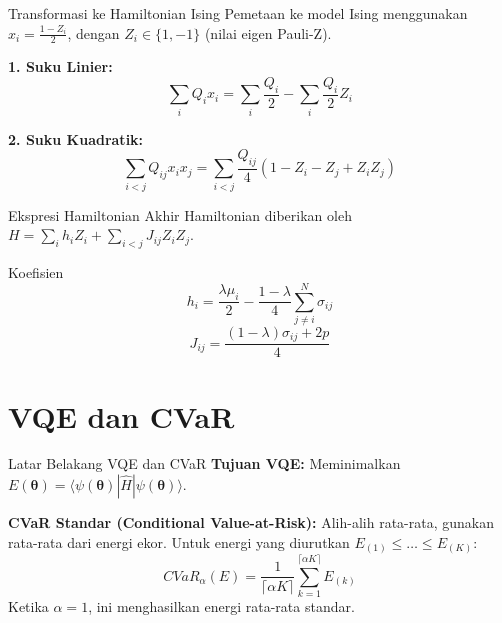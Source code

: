 \begin{frame}{Transformasi ke Hamiltonian Ising}
    Pemetaan ke model Ising menggunakan $x_i = \frac{1 - Z_i}{2}$, dengan $Z_i \in \{1, -1\}$ (nilai eigen Pauli-Z).
    \vspace{0.5cm}
    
    \textbf{1. Suku Linier:}
    $$ \sum_{i} Q_i x_i = \sum_{i} \frac{Q_i}{2} - \sum_{i} \frac{Q_i}{2} Z_i $$

    \textbf{2. Suku Kuadratik:}
    $$ \sum_{i<j} Q_{ij} x_i x_j = \sum_{i<j} \frac{Q_{ij}}{4} (1 - Z_i - Z_j + Z_i Z_j) $$
\end{frame}

\begin{frame}{Ekspresi Hamiltonian Akhir}
    Hamiltonian diberikan oleh $H = \sum_{i} h_i Z_i + \sum_{i<j} J_{ij} Z_i Z_j$.
    \vspace{0.5cm}

    \begin{block}{Koefisien}
        \begin{equation}
            h_i = \frac{\lambda \mu_i}{2} - \frac{1-\lambda}{4} \sum_{j \neq i}^N \sigma_{ij}
        \end{equation}
        \begin{equation}
            J_{ij} = \frac{(1-\lambda) \sigma_{ij} + 2p}{4}
        \end{equation}
    \end{block}
\end{frame}

\section{VQE dan CVaR}

\begin{frame}{Latar Belakang VQE dan CVaR}
    \textbf{Tujuan VQE:} Meminimalkan $E(\boldsymbol{\theta}) = \langle \psi(\boldsymbol{\theta}) | \hat{H} | \psi(\boldsymbol{\theta}) \rangle$.
    \vspace{0.5cm}

    \textbf{CVaR Standar (Conditional Value-at-Risk):}
    Alih-alih rata-rata, gunakan rata-rata dari energi ekor. Untuk energi yang diurutkan $E_{(1)} \le \dots \le E_{(K)}$:
    \begin{equation}
        CVaR_\alpha(E) = \frac{1}{\lceil \alpha K \rceil} \sum_{k=1}^{\lceil \alpha K \rceil} E_{(k)}
    \end{equation}
    Ketika $\alpha = 1$, ini menghasilkan energi rata-rata standar.
\end{frame}

